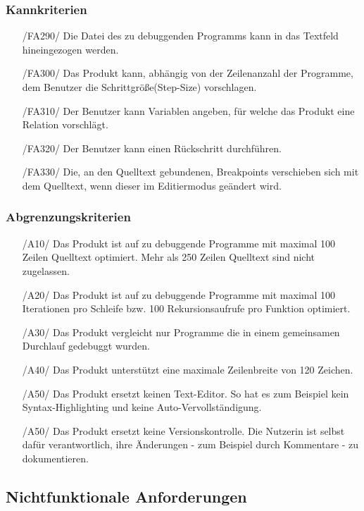 \documentclass[parskip=full]{scrartcl}
\begin{document}
 		\subsubsection{Kannkriterien}
		\begin{itemize}
		\item[/FA290/] Die Datei des zu debuggenden Programms kann in das Textfeld hineingezogen werden.
		\item[/FA300/] Das Produkt kann, abhängig von der Zeilenanzahl der Programme, dem Benutzer die Schrittgröße(Step-Size) vorschlagen.
		\item[/FA310/] Der Benutzer kann Variablen angeben, für welche das Produkt eine Relation vorschlägt.
		\item[/FA320/] Der Benutzer kann einen Rückschritt durchführen.
		\item[/FA330/] Die, an den Quelltext gebundenen, \glspl{Breakpoint} verschieben sich mit dem Quelltext, wenn dieser im \gls{Editiermodus} geändert wird.
		\end{itemize}		 		
 		
 		
 		\subsubsection{Abgrenzungskriterien}
 		\begin{itemize}
 		\item[/A10/] Das Produkt ist auf zu debuggende Programme mit maximal 100 Zeilen Quelltext optimiert. Mehr als 250 Zeilen Quelltext sind nicht zugelassen.
 		\item[/A20/] Das Produkt ist auf zu debuggende Programme mit maximal 100 Iterationen pro Schleife bzw. 100 Rekursionsaufrufe pro Funktion optimiert.
 		\item[/A30/] Das Produkt vergleicht nur Programme die in einem gemeinsamen Durchlauf gedebuggt wurden.
 		\item[/A40/] Das Produkt unterstützt eine maximale Zeilenbreite von 120 Zeichen.
 		\item[/A50/] Das Produkt ersetzt keinen Text-Editor. So hat es zum Beispiel kein Syntax-Highlighting und keine Auto-Vervollständigung.
 		\item[/A50/] Das Produkt ersetzt keine Versionskontrolle. Die Nutzerin ist selbst dafür verantwortlich, ihre Änderungen - zum Beispiel durch Kommentare - zu dokumentieren.
 		\end{itemize}
 		
 \newpage		
 		
	\subsection{Nichtfunktionale Anforderungen}
\end{document}
